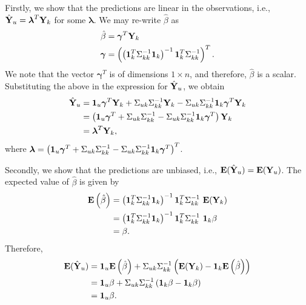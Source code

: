 \documentclass[a4paper,10pt]{article}
\def\bY{{\bf Y}}
\def\bE{{\bf E}}
\def\b1{{\bf 1}}
\def\blambda{{\boldsymbol \lambda}}
\def\bgamma{{\boldsymbol \gamma}}
\begin{document}
Firstly, we show that the predictions are linear in the observations, i.e., $\hat \bY_u = \blambda^T \bY_k$ for some $\blambda$. We may re-write $\hat \beta$ as
\begin{align*}
 \hat \beta &= \bgamma^T \bY_k \\
 \bgamma &= \left( \left( \b1_k^T \Sigma_{kk}^{-1} \b1_k \right)^{-1} \b1_k^T \Sigma_{kk}^{-1} \right)^T.
\end{align*}
We note that the vector $\bgamma^T$ is of dimensions $1 \times n$, and therefore, $\hat \beta$ is a scalar. Substituting the above in the expression for $\hat \bY_u$, we obtain
\begin{align*}
 \hat \bY_u &= \b1_u \bgamma^T \bY_k + \Sigma_{uk} \Sigma_{kk}^{-1} \bY_k -  \Sigma_{uk} \Sigma_{kk}^{-1}  \b1_k \bgamma^T \bY_k \\
      &= \left( \b1_u \bgamma^T + \Sigma_{uk} \Sigma_{kk}^{-1} -  \Sigma_{uk} \Sigma_{kk}^{-1}  \b1_k \bgamma^T \right) \bY_k \\
      &= \blambda^T \bY_k,
\end{align*}
where $\blambda = \left( \b1_u \bgamma^T + \Sigma_{uk} \Sigma_{kk}^{-1} -  \Sigma_{uk} \Sigma_{kk}^{-1}  \b1_k \bgamma^T \right)^T$.

Secondly, we show that the predictions are unbiased, i.e., $\bE(\hat \bY_u) = \bE(\bY_u)$. The expected value of $\hat \beta$ is given by
\begin{align*}
 \bE \left( \hat \beta \right) &= \left( \b1_k^T \Sigma_{kk}^{-1} \b1_k \right)^{-1} \b1_k^T \Sigma_{kk}^{-1} ~ \bE (\bY_k) \\
  &= \left( \b1_k^T \Sigma_{kk}^{-1} \b1_k \right)^{-1} \b1_k^T \Sigma_{kk}^{-1} ~ \b1_k \beta \\
  &= \beta.
\end{align*}
Therefore,
\begin{align*}
 \bE(\hat \bY_u) &=  \b1_u \bE\left(\hat \beta \right) + \Sigma_{uk} \Sigma_{kk}^{-1}\left( \bE(\bY_k) - \b1_k \bE \left(\hat \beta \right)\right) \\
 &= \b1_u \beta + \Sigma_{uk} \Sigma_{kk}^{-1}\left( \b1_k \beta - \b1_k \beta \right) \\
 &= \b1_u \beta.
\end{align*}
\end{document}

